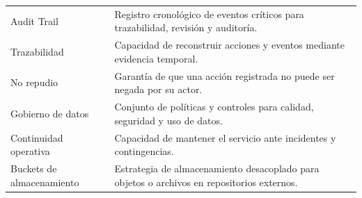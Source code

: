 \begin{longtable}{p{} p{}}
Audit Trail & Registro cronológico de eventos críticos para trazabilidad, revisión y auditoría. \\
Trazabilidad & Capacidad de reconstruir acciones y eventos mediante evidencia temporal. \\
No repudio & Garantía de que una acción registrada no puede ser negada por su actor. \\
Gobierno de datos & Conjunto de políticas y controles para calidad, seguridad y uso de datos. \\
Continuidad operativa & Capacidad de mantener el servicio ante incidentes y contingencias. \\
Buckets de almacenamiento & Estrategia de almacenamiento desacoplado para objetos o archivos en repositorios externos. \\
\bottomrule
\end{longtable}
